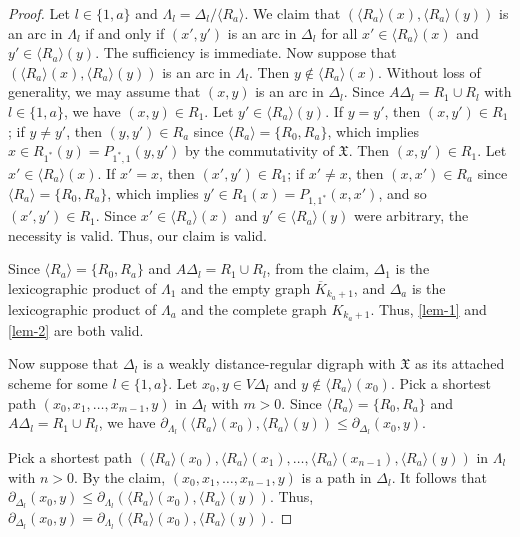 \documentclass[12pt,a4paper]{amsart}
\theoremstyle{definition}
\begin{document}
\begin{proof}
	
Let $l\in\{1,a\}$ and $\Lambda_l=\Delta_l/\langle R_a\rangle$. We claim that $(\langle R_a\rangle(x),\langle R_a\rangle(y))$ is an arc in $\Lambda_l$ if and only if $(x',y')$ is an arc in $\Delta_l$ for all $x'\in \langle R_a\rangle(x)$ and $y'\in\langle R_a\rangle(y)$. The sufficiency is immediate. Now suppose that $(\langle R_a\rangle(x),\langle R_a\rangle(y))$ is an arc in $\Lambda_l$. Then $y\notin \langle R_a\rangle(x)$. Without loss of generality, we may assume that $(x,y)$ is an arc in $\Delta_l$. Since $A\Delta_l=R_1\cup R_l$ with $l\in\{1,a\}$, we have $(x,y)\in R_1$. Let $y'\in \langle R_a\rangle(y)$. If $y=y'$, then $(x,y')\in R_1$; if $y\neq y'$, then $(y,y')\in R_a$ since $\langle R_a\rangle =\{R_0,R_a\}$, which implies $x\in R_{1^*}(y)=P_{1^*,1}(y,y')$ by the commutativity of $\mathfrak{X}$. Then $(x,y')\in R_1$. Let $x'\in \langle R_a\rangle(x)$. If $x'=x$, then $(x',y')\in R_1$; if $x'\neq x$, then $(x,x')\in R_a$ since $\langle R_a\rangle =\{R_0,R_a\}$, which implies $y'\in R_{1}(x)=P_{1,1^*}(x,x')$, and so $(x',y')\in R_1$. Since $x'\in \langle R_a\rangle(x)$ and $y'\in\langle R_a\rangle(y)$ were arbitrary, the necessity is valid. Thus, our claim is valid.
	
Since $\langle R_a\rangle =\{R_0,R_a\}$ and $A\Delta_l=R_1\cup R_l$, from the claim, $\Delta_1$ is the lexicographic product of $\Lambda_1$ and the empty graph $\overline{K}_{k_a+1}$, and $\Delta_a$ is the lexicographic product of $\Lambda_a$ and the complete graph $K_{k_a+1}$. Thus, \ref{lem-1} and \ref{lem-2} are both valid.
	
Now suppose that $\Delta_l$ is a weakly distance-regular digraph with $\mathfrak{X}$ as its attached scheme for some $l\in\{1,a\}$. Let $x_0,y\in V\Delta_l$ and $y\notin \langle R_a\rangle(x_0)$. Pick a shortest path $(x_0, x_1,\ldots,x_{m-1},y)$ in $\Delta_l$ with $m>0$. Since $\langle R_a\rangle =\{R_0,R_a\}$ and $A\Delta_l=R_1\cup R_l$, we have $\partial_{\Lambda_l}(\langle R_a\rangle(x_0),\langle R_a\rangle(y))\leq \partial_{\Delta_l}(x_0,y)$.
	
Pick a shortest path $(\langle R_a\rangle(x_0), \langle R_a\rangle(x_1),\ldots ,\langle R_a\rangle(x_{n-1}),\langle R_a\rangle(y))$ in $\Lambda_l$ with $n>0$. By the claim, $(x_0, x_1, \ldots,x_{n-1},y)$ is a path in $\Delta_l$. It follows that $\partial_{\Delta_l}(x_0,y)\leq \partial_{\Lambda_l}(\langle R_a\rangle(x_0),\langle R_a\rangle(y))$. Thus, $\partial_{\Delta_l}(x_0,y)=\partial_{\Lambda_l}(\langle R_a\rangle(x_0),\langle R_a\rangle(y))$.
	

\end{proof}
\end{document}
